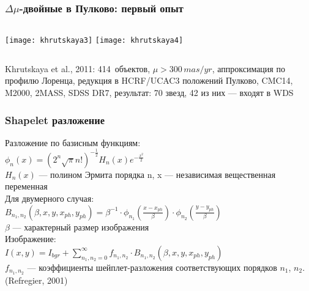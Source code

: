 
\begin{frame}%
\frametitle{$\Delta\mu$-двойные в Пулково: {\small первый опыт}}
\begin{columns}
	\texttt{[image: khrutskaya3]}
	\texttt{[image: khrutskaya4]}
\end{columns}
\begin{center}
{\scriptsize Khrutskaya et al., 2011: 414~объектов, $\mu > 300\,mas/yr$,  аппроксимация по профилю Лоренца, редукция в HCRF/UCAC3 положений Пулково, CMC14, M2000, 2MASS, SDSS DR7, результат: 70 звезд, 42 из них --- входят в WDS}
\end{center}
\end{frame}


\begin{frame}
\frametitle{Shapelet разложение}
{\footnotesize Разложение по базисным функциям:}\\
{\footnotesize $\phi_n(x) = \left(2^n\sqrt{\pi}n!\right)^{-\frac{1}{2}}H_n(x)e^{-\frac{x^2}{2}}$}\\
{\tiny $H_n(x)$ --- полином Эрмита порядка n, x --- независимая вещественная переменная}\\[10pt]
{\footnotesize Для двумерного случая:}\\
{\footnotesize $B_{n_1,n_2}(\beta,x,y,x_{ph},y_{ph}) = \beta^{-1}\cdot\phi_{n_1}\left(\frac{x-x_{ph}}{\beta}\right)\cdot\phi_{n_2}\left(\frac{y-y_{ph}}{\beta}\right)$}\\
{\tiny $\beta$ --- характерный размер изображения}\\[10pt]
{\footnotesize Изображение:}\\
{\footnotesize $I(x,y) = I_{bgr}+\sum_{n_1,n_2=0}^{\infty}f_{n_1,n_2}\cdot B_{n_1,n_2}(\beta,x,y,x_{ph},y_{ph})$}\\
{\tiny $f_{n_1,n_2}$ --- коэффициенты шейплет-разложения соответствующих порядков $n_1$, $n_2$.}\\[15pt]
{\footnotesize (Refregier, 2001)}
\end{frame}

